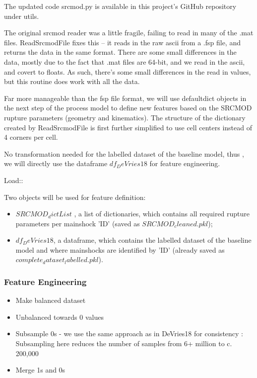 \documentclass[journal,transmag]{IEEEtran}
\begin{document}
The updated code srcmod.py is available in this project's GitHub repository under utils.

The original srcmod reader was a little fragile, failing to read in many of the .mat files. ReadSrcmodFile fixes this -- it reads in the raw ascii from a .fsp file, and returns the data in the same format. There are some small differences in the data, mostly due to the fact that .mat files are 64-bit, and we read in the ascii, and covert to floats. As such, there's some small differences in the read in values, but this routine does work with all the data.

Far more manageable than the fsp file format, we will use defaultdict objects in the next step of the process model to define new features based on the SRCMOD rupture parameters (geometry and kinematics). The structure of the dictionary created by ReadSrcmodFile is first further simplified to use cell centers instead of 4 corners per cell.

No transformation needed for the labelled dataset of the baseline model, thus , we will directly use the dataframe $df_DeVries18$ for feature engineering.

Load::

Two objects will be used for feature definition:
\begin{itemize}
\item $SRCMOD_dictList$ , a list of dictionaries, which contains all required rupture parameters per mainshock 'ID' (saved as $SRCMOD_cleaned.pkl$);
\item $df_DeVries18$, a dataframe, which contains the labelled dataset of the baseline model and where mainshocks are identified by 'ID' (already saved as $complete_dataset_labelled.pkl$).
\end{itemize}

\vspace{0.5em}
\subsubsection{Feature Engineering}

\begin{itemize}
  \item Make balanced dataset
  \item Unbalanced towards 0 values
  \item Subsample 0s - we use the same approach as in DeVries18 for consistency : Subsampling here reduces the number of samples from 6+ million to c. 200,000
  \item Merge 1s and 0s
\end{itemize}
\end{document}
